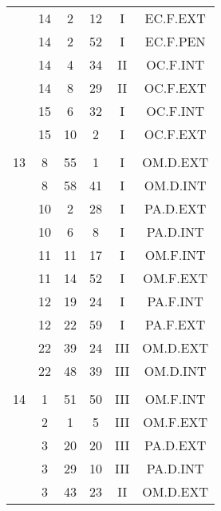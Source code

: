 \documentclass[12pt, a4paper]{article}
\begin{document}
\begin{multicols}{3}
{\begin{tabular}{c c c c c c}
	 	 	 	 & 14 & 2 & 12 & I & EC.F.EXT\\%
	 	 	 	 & 14 & 2 & 52 & I & EC.F.PEN\\%
	 	 	 	 & 14 & 4 & 34 & II & OC.F.INT\\%
	 	 	 	 & 14 & 8 & 29 & II & OC.F.EXT\\%
	 	 	 	 & 15 & 6 & 32 & I & OC.F.INT\\%
	 	 	 	 & 15 & 10 & 2 & I & OC.F.EXT\\%
	 	 	 	 & & & & & \\%
	 	 	 	13 & 8 & 55 & 1 & I & OM.D.EXT\\%
	 	 	 	 & 8 & 58 & 41 & I & OM.D.INT\\%
	 	 	 	 & 10 & 2 & 28 & I & PA.D.EXT\\%
	 	 	 	 & 10 & 6 & 8 & I & PA.D.INT\\%
	 	 	 	 & 11 & 11 & 17 & I & OM.F.INT\\%
	 	 	 	 & 11 & 14 & 52 & I & OM.F.EXT\\%
	 	 	 	 & 12 & 19 & 24 & I & PA.F.INT\\%
	 	 	 	 & 12 & 22 & 59 & I & PA.F.EXT\\%
	 	 	 	 & 22 & 39 & 24 & III & OM.D.EXT\\%
	 	 	 	 & 22 & 48 & 39 & III & OM.D.INT\\%
	 	 	 	 & & & & & \\%
	 	 	 	14 & 1 & 51 & 50 & III & OM.F.INT\\%
	 	 	 	 & 2 & 1 & 5 & III & OM.F.EXT\\%
	 	 	 	 & 3 & 20 & 20 & III & PA.D.EXT\\%
	 	 	 	 & 3 & 29 & 10 & III & PA.D.INT\\%
	 	 	 	 & 3 & 43 & 23 & II & OM.D.EXT\\%

\end{tabular}}
\end{multicols}
\end{document}
